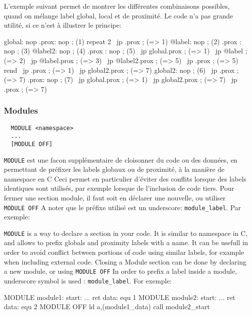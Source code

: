 \begin{xfr}
L'exemple suivant permet de montrer les différentes combinaisons possibles, quand on mélange label global, local et de proximité.
Le code n'a pas grande utilité, si ce n'est à illustrer le principe:
\end{xfr}

\begin{code}
  global: nop
  .prox:  nop ; (1)
  \medskip
  repeat 2
  \           jp .prox ;  (=> 1)
  @label:   nop  ; (2)
  .prox :   nop  ; (3)
  @label2:  nop  ; (4)
  .prox :   nop  ; (5)
  \           jp global.prox  ; (=> 1)
  \           jp @label       ; (=> 2)
  \           jp @label.prox  ; (=> 3)
  \           jp @label2.prox ; (=> 5)
  \           jp .prox        ; (=> 5)
  rend
  \medskip
  \           jp .prox        ; (=> 1)
  \           jp global2.prox ; (=> 7)
  \medskip
  global2:    nop  ; (6)
  \           jp .prox        ; (=> 7)
  .prox:      nop ; (7)
  \           jp global.prox  ; (=> 1)
  \           jp global2.prox ; (=> 7)
  \           jp .prox        ; (=> 7)
  \end{code}


\subsubsection{Modules}\label{MODULES}

\begin{verbatim}
  MODULE <namespace>
  ...
  [MODULE OFF]
\end{verbatim}

\begin{xfr}

\texttt{MODULE} est une facon supplémentaire de cloisonner du code ou des données, en permettant de préfixer les labels globaux ou de proximité, à la manière de namespace en C
Ceci permet en particulier d'éviter des conflits lorsque des labels identiques sont utilisés, par exemple lorsque de l'inclusion de code tiers.
Pour fermer une section module, il faut soit en déclarer une nouvelle, ou utiliser \texttt{MODULE OFF}
A noter que le préfixe utilisé est un underscore: \texttt{module\_label}. Par exemple:
\end{xfr}

\begin{xen}
\texttt{MODULE} is a way to declare a section in your code. It is similar to namespace in C, and allows to prefix globals and proximity labels with a name.
It can be usefull in order to avoid conflict between portions of code using similar labels, for example when including external code.
Closing a Module section can be done by declaring a new module, or using \texttt{MODULE OFF}
In order to prefix a label inside a module, underscore symbol is used : \texttt{module\_label}. For exemple:
\end{xen}

\begin{code}
  MODULE module1:
  start:
    ...
    ret
  data: equ 1
\medskip
MODULE module2:
  start:
    ...
    ret
  data: equ 2
MODULE OFF
\medskip
 ld a,(module1\_data)
 call module2\_start
\end{code}
